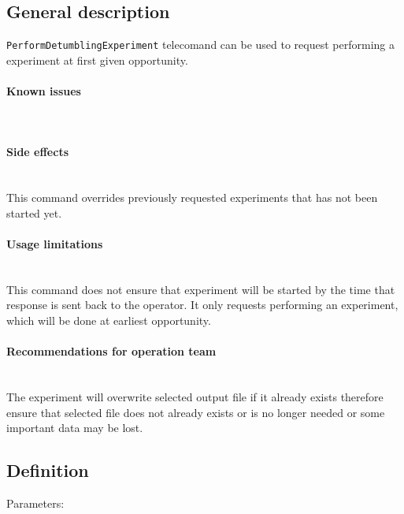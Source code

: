 

\subsection{General description}
\texttt{PerformDetumblingExperiment} telecomand can be used to request performing a \detumbling 
experiment at first given opportunity.

\paragraph{Known issues} \mbox{} \\
\None

\paragraph{Side effects} \mbox{} \\
This command overrides previously requested experiments that has not been started yet. 

\paragraph{Usage limitations} \mbox{} \\
This command does not ensure that \detumbling experiment will be started by the time that 
response is sent back to the operator. It only requests performing an experiment, which 
will be done at earliest opportunity.

\paragraph{Recommendations for operation team} \mbox{} \\
The experiment will overwrite selected output file if it already exists therefore ensure 
that selected file does not already exists or is no longer needed or some important data
may be lost.

\subsection{Definition}

Parameters:

\begin{tcarglist}
\end{tcarglist}

